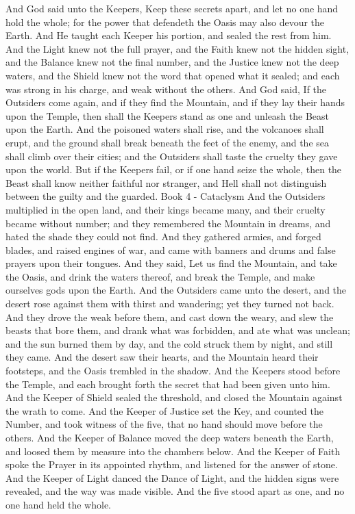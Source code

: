 And God said unto the Keepers, Keep these secrets apart, and let no one hand hold the whole; for the power that defendeth the Oasis may also devour the Earth. And He taught each Keeper his portion, and sealed the rest from him. And the Light knew not the full prayer, and the Faith knew not the hidden sight, and the Balance knew not the final number, and the Justice knew not the deep waters, and the Shield knew not the word that opened what it sealed; and each was strong in his charge, and weak without the others.
And God said, If the Outsiders come again, and if they find the Mountain, and if they lay their hands upon the Temple, then shall the Keepers stand as one and unleash the Beast upon the Earth. And the poisoned waters shall rise, and the volcanoes shall erupt, and the ground shall break beneath the feet of the enemy, and the sea shall climb over their cities; and the Outsiders shall taste the cruelty they gave upon the world. But if the Keepers fail, or if one hand seize the whole, then the Beast shall know neither faithful nor stranger, and Hell shall not distinguish between the guilty and the guarded.
Book 4 - Cataclysm
And the Outsiders multiplied in the open land, and their kings became many, and their cruelty became without number; and they remembered the Mountain in dreams, and hated the shade they could not find. And they gathered armies, and forged blades, and raised engines of war, and came with banners and drums and false prayers upon their tongues. And they said, Let us find the Mountain, and take the Oasis, and drink the waters thereof, and break the Temple, and make ourselves gods upon the Earth.
And the Outsiders came unto the desert, and the desert rose against them with thirst and wandering; yet they turned not back. And they drove the weak before them, and cast down the weary, and slew the beasts that bore them, and drank what was forbidden, and ate what was unclean; and the sun burned them by day, and the cold struck them by night, and still they came. And the desert saw their hearts, and the Mountain heard their footsteps, and the Oasis trembled in the shadow.
And the Keepers stood before the Temple, and each brought forth the secret that had been given unto him. And the Keeper of Shield sealed the threshold, and closed the Mountain against the wrath to come. And the Keeper of Justice set the Key, and counted the Number, and took witness of the five, that no hand should move before the others. And the Keeper of Balance moved the deep waters beneath the Earth, and loosed them by measure into the chambers below. And the Keeper of Faith spoke the Prayer in its appointed rhythm, and listened for the answer of stone. And the Keeper of Light danced the Dance of Light, and the hidden signs were revealed, and the way was made visible. And the five stood apart as one, and no one hand held the whole.
